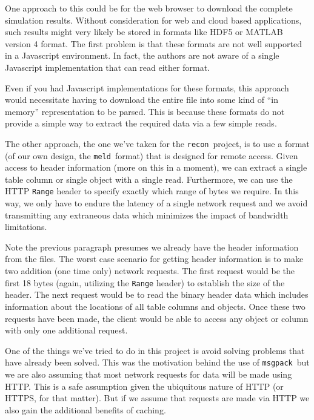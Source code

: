 \documentclass[11pt,a4paper,twocolumn]{article}
\newcommand{\recon}{\texttt{recon}}
\newcommand{\meld}{\texttt{meld}}
\newcommand{\msgpack}{\texttt{msgpack}}
\newcommand{\code}[1]{\texttt{#1}} %
\begin{document}
One approach to this could be for the web browser to download the
complete simulation results.  Without consideration for web and cloud
based applications, such results might very likely be stored in
formats like HDF5 or MATLAB version 4 format.  The first problem is
that these formats are not well supported in a Javascript environment.
In fact, the authors are not aware of a single Javascript
implementation that can read either format.

Even if you had Javascript implementations for these formats, this
approach would necessitate having to download the entire file into
some kind of ``in memory'' representation to be parsed.  This is
because these formats do not provide a simple way to extract the
required data via a few simple reads.

The other approach, the one we've taken for the \recon\ project, is to
use a format (of our own design, the \meld\ format) that is designed
for remote access.  Given access to header information (more on this
in a moment), we can extract a single table column or single object
with a single read.  Furthermore, we can use the HTTP \code{Range}
header to specify exactly which range of bytes we require.  In this
way, we only have to endure the latency of a single network request
and we avoid transmitting any extraneous data which minimizes the
impact of bandwidth limitations.


Note the previous paragraph presumes we already have the header
information from the files.  The worst case scenario for getting
header information is to make two addition (one time only) network
requests.  The first request would be the first 18 bytes (again,
utilizing the \code{Range} header) to establish the size of the
header.  The next request would be to read the binary header data
which includes information about the locations of all table columns
and objects.  Once these two requests have been made, the client would
be able to access any object or column with only one additional
request.


One of the things we've tried to do in this project is avoid solving
problems that have already been solved.  This was the motivation
behind the use of \msgpack\ but we are also assuming that most network
requests for data will be made using HTTP.  This is a safe assumption
given the ubiquitous nature of HTTP (or HTTPS, for that matter).  But
if we assume that requests are made via HTTP we also gain the
additional benefits of caching.
\end{document}
